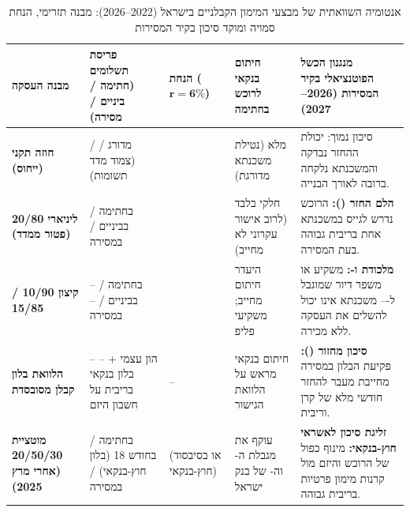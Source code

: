 \begin{table}[htbp]
\caption{אנטומיה השוואתית של מבצעי המימון הקבלניים בישראל (\num{2022}--\num{2026}): מבנה תזרימי, הנחת  סמויה ומוקד סיכון בקיר המסירות}
\label{tab:israel_promotions_anatomy}
\centering
\small
\renewcommand{\arraystretch}{1.28}
\begin{tabularx}{\textwidth}{R{2.5cm} R{2.8cm} R{1.9cm} R{2.1cm} Y}
\toprule
{}
\textbf{מבנה העסקה} & \textbf{פריסת תשלומים (חתימה / ביניים / מסירה)} & \textbf{הנחת  ($\mathbf{r=6\%}$)} & \textbf{חיתום בנקאי לרוכש בחתימה} & \textbf{מנגנון הכשל הפוטנציאלי בקיר המסירות (\num{2026}--\num{2027})} \\
\midrule
\textbf{חוזה תקני (ייחוס)} &  /  מדורג /  (צמוד מדד תשומות) &  & מלא (נטילת משכנתא מדורגת) & סיכון נמוך: יכולת ההחזר נבדקה והמשכנתא נלקחה ברובה לאורך הבנייה. \\
\textbf{ליניארי \num{20/80} (פטור ממדד)} &  בחתימה /  בביניים /  במסירה &  & חלקי בלבד (לרוב אישור עקרוני לא מחייב) & \textbf{הלם החזר ():} הרוכש נדרש לגייס  במשכנתא אחת בריבית גבוהה בעת המסירה. \\
\textbf{קיצון \num{10/90} / \num{15/85}} & -- בחתימה /  בביניים / -- במסירה &  & היעדר חיתום מחייב; משקיעי פליפ & \textbf{מלכודת  ו-:} משקיע או משפר דיור שמוגבל ל--- משכנתא אינו יכול להשלים את העסקה ללא מכירה. \\
\textbf{הלוואת בלון קבלן מסובסדת} & -- הון עצמי + -- בלון בנקאי בריבית על חשבון היזם & -- & חיתום בנקאי מראש על הלוואת הגישור & \textbf{סיכון מחזור ():} פקיעת הבלון במסירה מחייבת מעבר להחזר חודשי מלא של קרן וריבית. \\
\textbf{מוטציית \num{20/50/30} (אחרי מרץ \num{2025})} &  בחתימה /  בחודש \num{18} (בלון חוץ-בנקאי) /  במסירה &  (או  בסיבסוד חוץ-בנקאי) & עוקף את מגבלת ה- וה- של בנק ישראל & \textbf{זליגת סיכון לאשראי חוץ-בנקאי:} מינוף כפול של הרוכש והיזם מול קרנות מימון פרטיות בריבית גבוהה. \\
\bottomrule
\end{tabularx}
\end{table}


